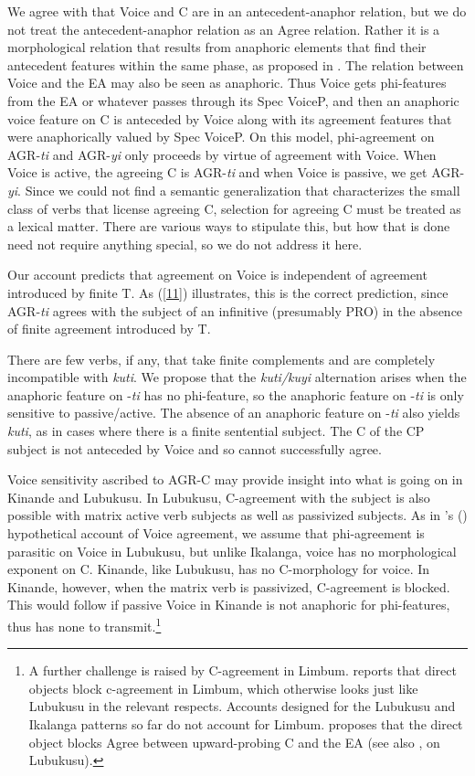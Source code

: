 \documentclass[output=paper,
modfonts
]{langscibook}
\begin{document}
We agree with \citeauthor{Diercks2017a} that Voice and C are in an antecedent-anaphor relation, but we do not treat the antecedent-anaphor relation as an Agree relation. Rather it is a morphological relation that results from anaphoric elements that find their antecedent features within the same phase, as proposed in \citet{Safir2014}. The relation between Voice and the EA may also be seen as anaphoric. Thus Voice gets phi-features from the EA or whatever passes through its Spec VoiceP, and then an anaphoric voice feature on C is anteceded by Voice along with its agreement features that were anaphorically valued by Spec VoiceP. On this model, phi-agreement on AGR-\textit{ti} and AGR-\textit{yi} only proceeds by virtue of agreement with Voice. When Voice is active, the agreeing C is AGR-\textit{ti} and when Voice is passive, we get AGR-\textit{yi}. Since we could not find a semantic generalization that characterizes the small class of verbs that license agreeing C, selection for agreeing C must be treated as a lexical matter. There are various ways to stipulate this, but how that is done need not require anything special, so we do not address it here.

Our account predicts that agreement on Voice is independent of agreement introduced by finite T. As (\ref{11}) illustrates, this is the correct prediction, since AGR-\textit{ti} agrees with the subject of an infinitive (presumably PRO) in the absence of finite agreement introduced by T.\largerpage[-1]

There are few verbs, if any, that take finite complements and are completely incompatible with \textit{kuti}. We propose that the \textit{kuti/kuyi} alternation arises when the anaphoric feature on -\textit{ti} has no phi-feature, so the anaphoric feature on -\textit{ti} is only sensitive to passive/active. The absence of an anaphoric feature on -\textit{ti} also yields \textit{kuti}, as in cases where there is a finite sentential subject. The C of the CP subject is not anteceded by Voice and so cannot successfully agree.
    
Voice sensitivity ascribed to AGR-C may provide insight into what is going on in Kinande and Lubukusu. In Lubukusu, C-agreement with the subject is also possible with matrix active verb subjects as well as passivized subjects. As in \citeauthor{Diercks2010}’s (\citeyear{Diercks2010}) hypothetical account of Voice agreement, we assume that phi-agreement is parasitic on Voice in Lubukusu, but unlike Ikalanga, voice has no morphological exponent on C. Kinande, like Lubukusu, has no C-morphology for voice. In Kinande, however, when the matrix verb is passivized, C-agreement is blocked. This would follow if passive Voice in Kinande is not anaphoric for phi-features, thus has none to transmit.\footnote{A further challenge is raised by C-agreement in Limbum. \citet{Nformi2017a} reports that direct objects block c-agreement in Limbum, which otherwise looks just like Lubukusu in the relevant respects. Accounts designed for the Lubukusu and Ikalanga patterns so far do not account for Limbum. \citeauthor{Nformi2017a} proposes that the direct object blocks Agree between upward-probing C and the EA (see also \citealt{Carstens2016}, on Lubukusu).}
\end{document}
